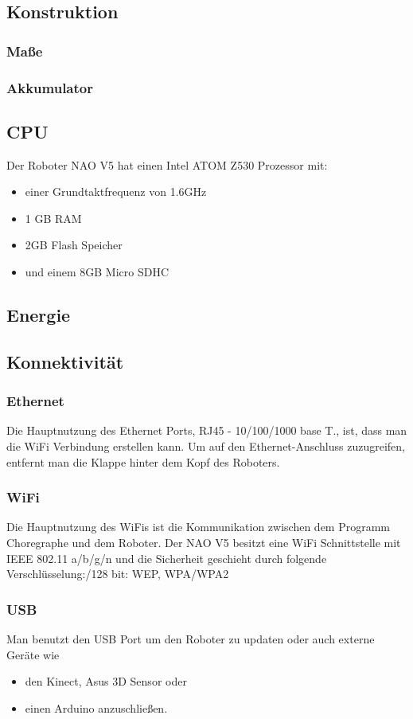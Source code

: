 \documentclass[12pt]{article}  %
\begin{document}
	\subsection{Konstruktion}
		\subsubsection{Maße}	
		\subsubsection{Akkumulator} 
	\subsection{CPU}
		Der Roboter NAO V5 hat einen Intel ATOM Z530 Prozessor mit:
		\begin{itemize}
			\item einer Grundtaktfrequenz von 1.6GHz
			\item 1 GB RAM
			\item 2GB Flash Speicher
			\item und einem 8GB Micro SDHC
		\end{itemize}			
	\subsection{Energie}
	\subsection{Konnektivität}
		\subsubsection{Ethernet}
			Die Hauptnutzung des Ethernet Ports, RJ45 - 10/100/1000 base T., ist, dass man die WiFi Verbindung erstellen kann.\newline
			Um auf den Ethernet-Anschluss zuzugreifen, entfernt man die Klappe hinter dem 
			Kopf des Roboters.
		\subsubsection{WiFi}
			Die Hauptnutzung des WiFis ist die Kommunikation zwischen dem Programm 
			Choregraphe und dem Roboter. \newline
			Der NAO V5 besitzt eine WiFi Schnittstelle mit IEEE 802.11 a/b/g/n und die 
			Sicherheit geschieht durch folgende Verschlüsselung:/128 bit: WEP, WPA/WPA2
		\subsubsection{USB}
			Man benutzt den USB Port um den Roboter zu updaten oder auch externe Geräte 
			wie
			\begin{itemize}
				\item den Kinect, Asus 3D Sensor oder
				\item einen Arduino anzuschließen.
			\end{itemize}
\end{document}
